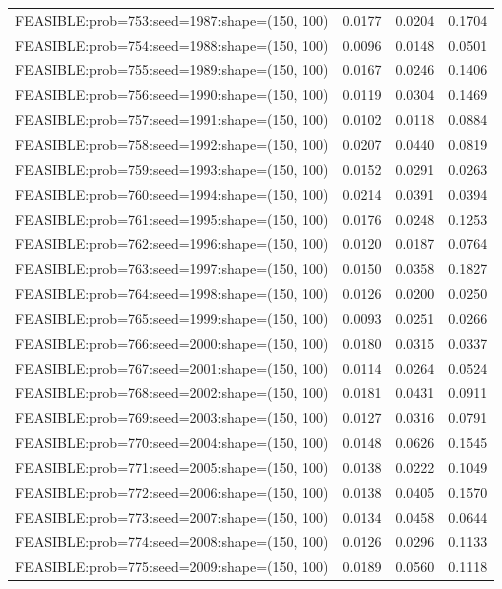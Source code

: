 \begin{longtable}{lccc}
FEASIBLE:prob=753:seed=1987:shape=(150, 100) & 0.0177 & 0.0204 & 0.1704 \\
FEASIBLE:prob=754:seed=1988:shape=(150, 100) & 0.0096 & 0.0148 & 0.0501 \\
FEASIBLE:prob=755:seed=1989:shape=(150, 100) & 0.0167 & 0.0246 & 0.1406 \\
FEASIBLE:prob=756:seed=1990:shape=(150, 100) & 0.0119 & 0.0304 & 0.1469 \\
FEASIBLE:prob=757:seed=1991:shape=(150, 100) & 0.0102 & 0.0118 & 0.0884 \\
FEASIBLE:prob=758:seed=1992:shape=(150, 100) & 0.0207 & 0.0440 & 0.0819 \\
FEASIBLE:prob=759:seed=1993:shape=(150, 100) & 0.0152 & 0.0291 & 0.0263 \\
FEASIBLE:prob=760:seed=1994:shape=(150, 100) & 0.0214 & 0.0391 & 0.0394 \\
FEASIBLE:prob=761:seed=1995:shape=(150, 100) & 0.0176 & 0.0248 & 0.1253 \\
FEASIBLE:prob=762:seed=1996:shape=(150, 100) & 0.0120 & 0.0187 & 0.0764 \\
FEASIBLE:prob=763:seed=1997:shape=(150, 100) & 0.0150 & 0.0358 & 0.1827 \\
FEASIBLE:prob=764:seed=1998:shape=(150, 100) & 0.0126 & 0.0200 & 0.0250 \\
FEASIBLE:prob=765:seed=1999:shape=(150, 100) & 0.0093 & 0.0251 & 0.0266 \\
FEASIBLE:prob=766:seed=2000:shape=(150, 100) & 0.0180 & 0.0315 & 0.0337 \\
FEASIBLE:prob=767:seed=2001:shape=(150, 100) & 0.0114 & 0.0264 & 0.0524 \\
FEASIBLE:prob=768:seed=2002:shape=(150, 100) & 0.0181 & 0.0431 & 0.0911 \\
FEASIBLE:prob=769:seed=2003:shape=(150, 100) & 0.0127 & 0.0316 & 0.0791 \\
FEASIBLE:prob=770:seed=2004:shape=(150, 100) & 0.0148 & 0.0626 & 0.1545 \\
FEASIBLE:prob=771:seed=2005:shape=(150, 100) & 0.0138 & 0.0222 & 0.1049 \\
FEASIBLE:prob=772:seed=2006:shape=(150, 100) & 0.0138 & 0.0405 & 0.1570 \\
FEASIBLE:prob=773:seed=2007:shape=(150, 100) & 0.0134 & 0.0458 & 0.0644 \\
FEASIBLE:prob=774:seed=2008:shape=(150, 100) & 0.0126 & 0.0296 & 0.1133 \\
FEASIBLE:prob=775:seed=2009:shape=(150, 100) & 0.0189 & 0.0560 & 0.1118 \\

\end{longtable}
